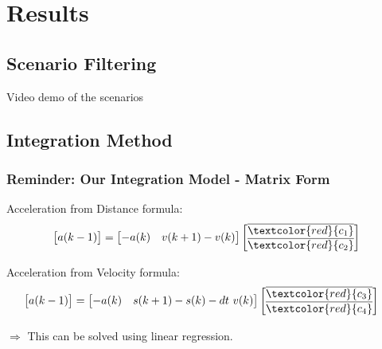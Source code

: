 
\section{Results}

\subsection{Scenario Filtering}
\begin{frame}
    \center Video demo of the scenarios
\end{frame}


\subsection{Integration Method}

\begin{frame}
  \frametitle{Reminder: Our Integration Model - Matrix Form}
    Acceleration from Distance formula:
    \begin{align*}
        \begin{bmatrix} a(k-1) \\ \end{bmatrix}
        &=
        \begin{bmatrix}
            -a(k)  & v(k+1) - v(k)   \\ 
        \end{bmatrix}
        \begin{bmatrix}
            \overline{\textcolor{red}{c_1}} \\
            \overline{\textcolor{red}{c_2}} \\
        \end{bmatrix} \\
    \end{align*}

    Acceleration from Velocity formula:
    \begin{align*}
        \begin{bmatrix}
            a(k-1) \\ 
        \end{bmatrix}
        &=
        \begin{bmatrix}
            -a(k) &    s(k+1) - s(k) - dt \  v(k)   \\ 
        \end{bmatrix}
        \begin{bmatrix}
            \overline{\textcolor{red}{c_3}} \\
            \overline{\textcolor{red}{c_4}} \\
        \end{bmatrix}
    \end{align*}

    \hfil

    $\Rightarrow$ This can be solved using linear regression.
\end{frame}

